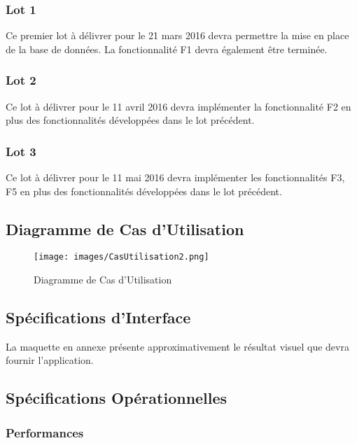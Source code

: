 \subsubsection{Lot 1}

Ce premier lot à délivrer pour le 21 mars 2016 devra permettre la mise en place de la base de données. La fonctionnalité F1 devra également être terminée.

\subsubsection{Lot 2}

Ce lot à délivrer pour le 11 avril 2016 devra implémenter la fonctionnalité F2 en plus des fonctionnalités développées dans le lot précédent.


\subsubsection{Lot 3}

Ce lot à délivrer pour le 11 mai 2016 devra implémenter les fonctionnalités F3{\color{red}{, F4}}, F5 {\color{red}{et F6}} en plus des fonctionnalités développées dans le lot précédent.

\subsection{Diagramme de Cas d'Utilisation}

\begin{figure}[!h]
\begin{center}

   \caption{\label{} Diagramme de Cas d'Utilisation}
   \texttt{[image: images/CasUtilisation2.png]}
   \centering

\end{center}
\end{figure}

\subsection{Spécifications d'Interface}
La maquette en annexe présente approximativement le résultat visuel que devra fournir l’application.

\subsection{Spécifications Opérationnelles}

\subsubsection{Performances}

